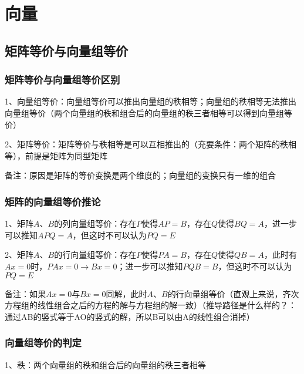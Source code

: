\chapter{向量}

\section{矩阵等价与向量组等价}



\subsection{矩阵等价与向量组等价区别}

1、向量组等价：向量组等价可以推出向量组的秩相等；向量组的秩相等无法推出向量组等价（两个向量组的秩和组合后的向量组的秩三者相等可以得到向量组等价）

2、矩阵等价：矩阵等价与秩相等是可以互相推出的（充要条件：两个矩阵的秩相等），前提是矩阵为同型矩阵

备注：原因是矩阵的等价变换是两个维度的；向量组的变换只有一维的组合



\subsection{矩阵的向量组等价推论}

1、矩阵$A、B$的列向量组等价：存在$P$使得$AP=B$，存在$Q$使得$BQ=A$，进一步可以推知$APQ=A$，但这时不可以认为$PQ=E$

2、矩阵$A、B$的行向量组等价：存在$P$使得$PA=B$，存在$Q$使得$QB=A$，此时有$Ax=0$时，$PAx=0 \rightarrow Bx=0$；进一步可以推知$PQB=B$，但这时不可以认为$PQ=E$

备注：如果$Ax=0$与$Bx=0$同解，此时$A、B$的行向量组等价（直观上来说，齐次方程组的线性组合之后的方程的解与方程组的解一致）（推导路径是什么样的？：通过AB的竖式等于AO的竖式的解，所以B可以由A的线性组合消掉）



\subsection{向量组等价的判定}

1、秩：两个向量组的秩和组合后的向量组的秩三者相等

